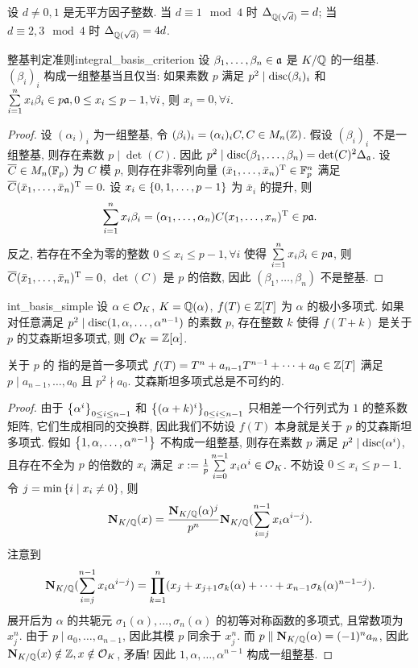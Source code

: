 \begin{exercise}
设 $d\neq 0,1$ 是无平方因子整数. 当 $d\equiv 1\mod 4$ 时 $\Delta_{{\mathbb{Q}}(\sqrt{d})}=d$; 当 $d\equiv 2,3\mod 4$ 时 $\Delta_{{\mathbb{Q}}(\sqrt{d})}=4d$.
\end{exercise}

\begin{lemma}{整基判定准则}{integral_basis_criterion}
设 $\beta_1,\dots,\beta_n\in {\mathfrak{a}}$ 是 $K/{\mathbb{Q}}$ 的一组基. $(\beta_i)_i$ 构成一组整基当且仅当: 如果素数 $p$ 满足 $p^2\mid{\mathrm{disc}}(\beta_i)_i$ 和 $\sum\limits_{i=1}^n x_i\beta_i\in p{\mathfrak{a}}, 0\le x_i\le p-1, \forall i$, 则 $x_i=0,\forall i$.
\end{lemma}
\begin{proof}
设 $(\alpha_i)_i$ 为一组整基, 令 $(\beta_i)_i=(\alpha_i)_iC,C\in M_n({\mathbb{Z}})$. 假设 $(\beta_i)_i$ 不是一组整基, 则存在素数 $p\mid \det(C)$. 因此 $p^2\mid {\mathrm{disc}}(\beta_1,\dots,\beta_n)=\det(C)^2 \Delta_{\mathfrak{a}}$. 设 $\overline C\in M_n({\mathbb{F}}_p)$ 为 $C$ 模 $p$, 则存在非零列向量 $(\bar x_1,\dots,\bar x_n)^{\mathrm{T}}\in{\mathbb{F}}_p^n$ 满足 $\overline C(\bar x_1,\dots,\bar x_n)^{\mathrm{T}}=0.$ 设 $x_i\in\left\{0,1,\dots,p-1\right\}$ 为 $\bar x_i$ 的提升, 则 
	\[\sum_{i=1}^n x_i\beta_i=(\alpha_1,\dots,\alpha_n) C(x_1,\dots,x_n)^{\mathrm{T}}\in p{\mathfrak{a}}.\]
反之, 若存在不全为零的整数 $0\le x_i\le p-1, \forall i$ 使得 $\sum\limits_{i=1}^n x_i\beta_i\in p{\mathfrak{a}}$, 则 $\overline C (\bar x_1,\dots,\bar x_n)^{\mathrm{T}}=0$, $\det(C)$ 是 $p$ 的倍数, 因此 $(\beta_1,\dots,\beta_n)$ 不是整基. 
\end{proof}

\begin{proposition}{}{int_basis_simple}
设 $\alpha\in{\mathcal{O}}_K$, $K={\mathbb{Q}}(\alpha)$, $f(T)\in{\mathbb{Z}}[T]$ 为 $\alpha$ 的极小多项式. 如果对任意满足 $p^2\mid{\mathrm{disc}}(1,\alpha,\dots,\alpha^{n-1})$ 的素数 $p$, 存在整数 $k$ 使得 $f(T+k)$ 是关于 $p$ 的艾森斯坦多项式, 则 ${\mathcal{O}}_K={\mathbb{Z}}[\alpha]$.
\end{proposition}

关于 $p$ 的 指的是首一多项式 $f(T)=T^n+a_{n-1}T^{n-1}+\dots+a_0 \in{\mathbb{Z}}[T]$ 满足 $p\mid a_{n-1},\dots,a_0$ 且 $p^2\nmid a_0$. 艾森斯坦多项式总是不可约的.

\begin{proof}
由于 $\left\{\alpha^i\right\}_{0\le i\le n-1}$ 和 $\left\{(\alpha+k)^i\right\}_{0\le i\le n-1}$ 只相差一个行列式为 $1$ 的整系数矩阵, 它们生成相同的交换群, 因此我们不妨设 $f(T)$ 本身就是关于 $p$ 的艾森斯坦多项式.
假如 $\left\{1,\alpha,\dots,\alpha^{n-1}\right\}$ 不构成一组整基, 则存在素数 $p$ 满足 $p^2\mid {\mathrm{disc}}(\alpha^i)$, 且存在不全为 $p$ 的倍数的 $x_i$ 满足 $x:=\frac{1}{p}\sum\limits_{i=0}^{n-1} x_i\alpha^i \in {\mathcal{O}}_K$. 不妨设 $0\le x_i\le p-1$. 令 $j=\min\left\{i\mid x_i\neq 0\right\}$, 则
  \[{\mathbf{N}}_{K/{\mathbb{Q}}}(x)=\frac{{\mathbf{N}}_{K/{\mathbb{Q}}}(\alpha)^j}{p^n}{\mathbf{N}}_{K/{\mathbb{Q}}}(\sum_{i=j}^{n-1}x_i\alpha^{i-j}).\]
注意到
  \[{\mathbf{N}}_{K/{\mathbb{Q}}}(\sum_{i=j}^{n-1}x_i\alpha^{i-j})=\prod_{k=1}^n(x_j+x_{j+1}\sigma_k(\alpha)+\dots+x_{n-1}\sigma_k(\alpha)^{n-1-j}).\]
展开后为 $\alpha$ 的共轭元 $\sigma_1(\alpha),\dots,\sigma_n(\alpha)$ 的初等对称函数的多项式, 且常数项为 $x_j^n$. 由于 $p\mid a_0,\dots,a_{n-1}$, 因此其模 $p$ 同余于 $x_j^n$. 而 $p\parallel {\mathbf{N}}_{K/{\mathbb{Q}}}(\alpha)=(-1)^n a_n$, 因此 ${\mathbf{N}}_{K/{\mathbb{Q}}}(x)\notin{\mathbb{Z}},x\notin {\mathcal{O}}_K$, 矛盾! 因此 $1,\alpha,\dots,\alpha^{n-1}$ 构成一组整基.
\end{proof}

